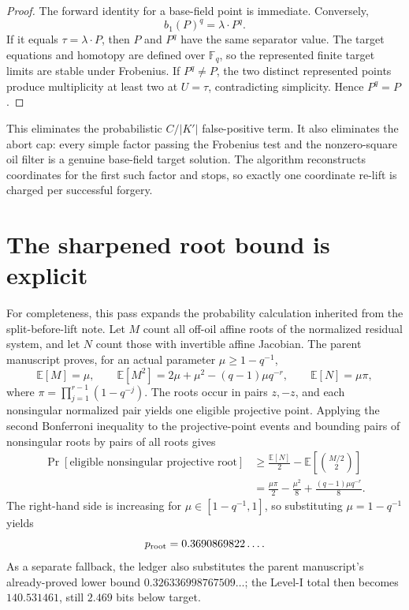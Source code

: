 \documentclass[11pt]{article}
\theoremstyle{definition}
\newcommand{\F}{\mathbb F}
\begin{document}
\begin{proof}
The forward identity for a base-field point is immediate.  Conversely,
\[
 b_1(P)^q
 =\lambda\cdot P^q.
\]
If it equals $\tau=\lambda\cdot P$, then $P$ and $P^q$ have the same separator value.  The target equations and homotopy are defined over $\F_q$, so the represented finite target limits are stable under Frobenius.  If $P^q\ne P$, the two distinct represented points produce multiplicity at least two at $U=\tau$, contradicting simplicity.  Hence $P^q=P$.
\end{proof}

This eliminates the probabilistic $C/|K'|$ false-positive term.  It also eliminates the abort cap: every simple factor passing the Frobenius test and the nonzero-square oil filter is a genuine base-field target solution.  The algorithm reconstructs coordinates for the first such factor and stops, so exactly one coordinate re-lift is charged per successful forgery.

\section{The sharpened root bound is explicit}\label{sec:rootbound}

For completeness, this pass expands the probability calculation inherited from the split-before-lift note.  Let $M$ count all off-oil affine roots of the normalized residual system, and let $N$ count those with invertible affine Jacobian.  The parent manuscript proves, for an actual parameter $\mu\ge 1-q^{-1}$,
\[
 \mathbb E[M]=\mu,
 \qquad
 \mathbb E[M^2]=2\mu+\mu^2-(q-1)\mu q^{-r},
 \qquad
 \mathbb E[N]=\mu\pi,
\]
where $\pi=\prod_{j=1}^{r-1}(1-q^{-j})$.  The roots occur in pairs $z,-z$, and each nonsingular normalized pair yields one eligible projective point.  Applying the second Bonferroni inequality to the projective-point events and bounding pairs of nonsingular roots by pairs of all roots gives
\begin{align*}
 \Pr[\text{eligible nonsingular projective root}]
 &\ge \frac{\mathbb E[N]}2
      -\mathbb E\!\left[\binom{M/2}{2}\right]\\
 &=\frac{\mu\pi}{2}-\frac{\mu^2}{8}
   +\frac{(q-1)\mu q^{-r}}8.
\end{align*}
The right-hand side is increasing for $\mu\in[1-q^{-1},1]$, so substituting $\mu=1-q^{-1}$ yields
\[
 p_{\rm root}=0.3690869822\ldots.
\]
As a separate fallback, the ledger also substitutes the parent manuscript's already-proved lower bound $0.326336998767509\ldots$; the Level-I total then becomes $140.531461$, still $2.469$ bits below target.
\end{document}
